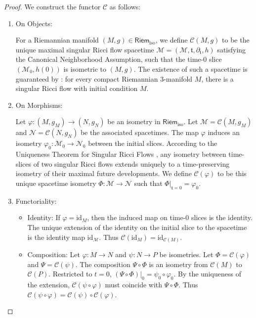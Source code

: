 \documentclass[11pt]{article}
\newcommand{\RiemIso}{\mathsf{Riem}_{\mathrm{iso}}}
\begin{document}
\begin{proof}
We construct the functor $\mathcal{C}$ as follows:
\begin{enumerate}
\item On Objects:

For a Riemannian manifold $(M, g) \in \RiemIso$, we define $\mathcal{C}(M, g)$ to be the unique maximal singular Ricci flow spacetime $\mathcal{M} = (\mathcal{M}, \mathfrak{t}, \partial_{\mathfrak{t}}, h)$ satisfying the Canonical Neighborhood Assumption, such that the time-$0$ slice $(\mathcal{M}_0, h(0))$ is isometric to $(M, g)$. The existence of such a spacetime is guaranteed by \cite[Theorem 1.1]{KL17}: for every compact Riemannian 3-manifold $M$, there is a singular Ricci flow with initial condition $M$.



\item On Morphisms:


Let $\varphi: (M, g_M) \to (N, g_N)$ be an isometry in $\RiemIso$. Let $\mathcal{M} = \mathcal{C}(M, g_M)$ and $\mathcal{N} = \mathcal{C}(N, g_N)$ be the associated spacetimes. The map $\varphi$ induces an isometry $\varphi_0: \mathcal{M}_0 \to \mathcal{N}_0$ between the initial slices.
According to the Uniqueness Theorem for Singular Ricci Flows \cite[Theorem 1.3]{BK19}, any isometry between time-slices of two singular Ricci flows extends uniquely to a time-preserving isometry of their maximal future developments.
We define $\mathcal{C}(\varphi)$ to be this unique spacetime isometry $\Phi: \mathcal{M} \to \mathcal{N}$ such that $\Phi|_{\mathfrak{t}=0} = \varphi_0$.

\item Functoriality:
\begin{itemize}
    \item[(i)] Identity: If $\varphi = \mathrm{id}_M$, then the induced map on time-0 slices is the identity. The unique extension of the identity on the initial slice to the spacetime is the identity map $\mathrm{id}_{\mathcal{M}}$. Thus $\mathcal{C}(\mathrm{id}_M) = \mathrm{id}_{\mathcal{C}(M)}$.
    \item[(ii)] Composition: Let $\varphi: M \to N$ and $\psi: N \to P$ be isometries. Let $\Phi = \mathcal{C}(\varphi)$ and $\Psi = \mathcal{C}(\psi)$. The composition $\Psi \circ \Phi$ is an isometry from $\mathcal{C}(M)$ to $\mathcal{C}(P)$. Restricted to $t=0$, $(\Psi \circ \Phi)|_0 = \psi_0 \circ \varphi_0$. By the uniqueness of the extension, $\mathcal{C}(\psi \circ \varphi)$ must coincide with $\Psi \circ \Phi$. Thus $\mathcal{C}(\psi \circ \varphi) = \mathcal{C}(\psi) \circ \mathcal{C}(\varphi)$.
\end{itemize}
\end{enumerate}
\end{proof}
\end{document}
